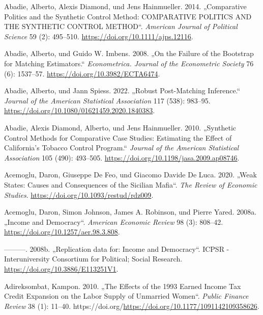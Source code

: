\documentclass[
  a4paper,
  DIV=11,
  oneside]{scrreprt}
\newlength{\cslhangindent}
\newenvironment{CSLReferences}[2] %
 {\begin{list}{}{%
  \setlength{\itemindent}{0pt}
  \setlength{\leftmargin}{0pt}
  \setlength{\parsep}{0pt}
  \ifodd #1
   \setlength{\leftmargin}{\cslhangindent}
   \setlength{\itemindent}{-1\cslhangindent}
  \fi
  \setlength{\itemsep}{#2\baselineskip}}}
 {\end{list}}
\begin{document}
\label{refs}
\begin{CSLReferences}{1}{0}
Abadie, Alberto, Alexis Diamond, und Jens Hainmueller. 2014.
{„Comparative Politics and the Synthetic Control Method: COMPARATIVE
POLITICS AND THE SYNTHETIC CONTROL METHOD``}. \emph{American Journal of
Political Science} 59 (2): 495--510.
\url{https://doi.org/10.1111/ajps.12116}.

Abadie, Alberto, und Guido W. Imbens. 2008. {„On the Failure of the
Bootstrap for Matching Estimators.``} \emph{Econometrica. Journal of the
Econometric Society} 76 (6): 1537--57.
\url{https://doi.org/10.3982/ECTA6474}.

Abadie, Alberto, und Jann Spiess. 2022. {„Robust Post-Matching
Inference.``} \emph{Journal of the American Statistical Association} 117
(538): 983--95. \url{https://doi.org/10.1080/01621459.2020.1840383}.

Abadie, Alexis Diamond, Alberto, und Jens Hainmueller. 2010. {„Synthetic
Control Methods for Comparative Case Studies: Estimating the Effect of
California's Tobacco Control Program.``} \emph{Journal of the American
Statistical Association} 105 (490): 493--505.
\url{https://doi.org/10.1198/jasa.2009.ap08746}.

Acemoglu, Daron, Giuseppe De Feo, und Giacomo Davide De Luca. 2020.
{„Weak States: Causes and Consequences of the Sicilian Mafia``}.
\emph{The Review of Economic Studies}.
\url{https://doi.org/10.1093/restud/rdz009}.

Acemoglu, Daron, Simon Johnson, James A. Robinson, und Pierre Yared.
2008a. {„Income and Democracy``}. \emph{American Economic Review} 98
(3): 808--42. \url{https://doi.org/10.1257/aer.98.3.808}.

---------. 2008b. {„Replication data for: Income and Democracy``}. ICPSR
- Interuniversity Consortium for Political; Social Research.
\url{https://doi.org/10.3886/E113251V1}.

Adireksombat, Kampon. 2010. {„The Effects of the 1993 Earned Income Tax
Credit Expansion on the Labor Supply of Unmarried Women``}. \emph{Public
Finance Review} 38 (1): 11--40.
https://doi.org/\url{https://doi.org/10.1177/1091142109358626}.


\end{CSLReferences}
\end{document}
